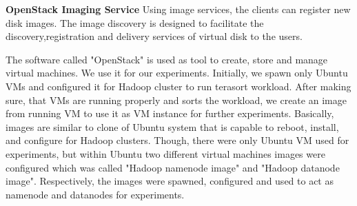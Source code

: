 \textbf{OpenStack Imaging Service } Using image services, the clients can register new disk images. The image discovery is designed to facilitate the discovery,registration and delivery services of virtual disk to the users.               
              
 
The software called "OpenStack" is used as tool to create, store and manage virtual machines. We use it for our experiments. Initially, we spawn only Ubuntu VMs and configured it for Hadoop cluster to run terasort workload. After making sure, that VMs are running properly and sorts the workload, we create an image from  running VM to use it as VM instance for further experiments. Basically, images are similar to clone of Ubuntu system that is capable to reboot, install, and configure for Hadoop clusters. Though, there were only Ubuntu VM used for experiments, but within Ubuntu two different virtual machines images were configured which was called "Hadoop namenode image" and "Hadoop datanode image". Respectively, the images were spawned, configured and used to act as namenode and datanodes for experiments.\\ 


